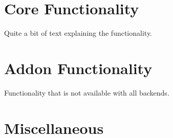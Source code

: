 \documentclass[11pt]{report}
\begin{document}




\clearpage

\tableofcontents

\clearpage
{}




\part{Core Functionality}
Quite a bit of text explaining the functionality.











\part{Addon Functionality}
Functionality that is not available with all backends.







%



\part{Miscellaneous}



\begin{appendices}



 
\end{appendices}





\printindex
\end{document}
